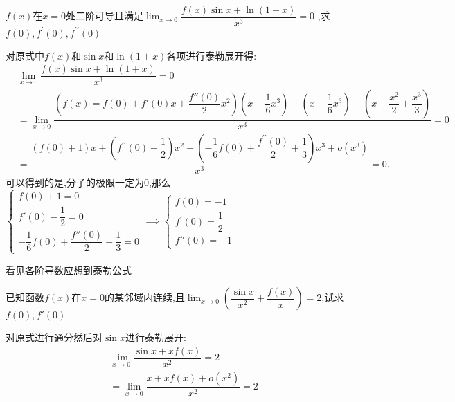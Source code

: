 \documentclass[8pt a4paper, oneside, UTF8]{ctexbook}
\begin{document}
\begin{sloppypar}
\begin{problem}
    $f(x)$在$x=0$处二阶可导且满足$\lim_{x\to 0}\dfrac{f(x)\sin x+\ln(1+x)}{x^3}=0$ ,求$f(0),f^{\prime}(0),f^{\prime\prime}(0)$
    \end{problem}
    \begin{solution}
        对原式中$f(x)$和$\sin x$和$\ln(1+x)$各项进行泰勒展开得:
        \begin{equation*}
            \begin{split}
                & \lim_{x\to 0}\dfrac{f(x)\sin x+\ln(1+x)}{x^3}=0 \\
                & = \lim_{x \to 0}\dfrac{(f(x)=f(0)+f'(0)x+\dfrac{f''(0)}{2}x^2)(x-\dfrac{1}{6}x^3)-(x-\dfrac{1}{6}x^3)+(x-\dfrac{x^2}{2}+\dfrac{x^3}{3})}{x^3}=0 \\
                & = \dfrac{(f(0)+1)x+(f^{\prime\prime}(0)-\dfrac{1}{2})x^{2}+(-\dfrac{1}{6}f(0)+\dfrac{f^{\prime\prime}(0)}{2}+\dfrac{1}{3})x^{3}+o(x^{3})}{x^{3}}=0.
            \end{split}
        \end{equation*}
        可以得到的是,分子的极限一定为0,那么$\begin{cases}f(0)+1=0\\f'(0)-\dfrac{1}{2}=0\\-\dfrac{1}{6}f(0)+\dfrac{f''(0)}{2}+\dfrac{1}{3}=0\end{cases}\implies \begin{cases}f(0)=-1\\f^{\prime}(0)=\dfrac{1}{2}\\f''(0)=-1\end{cases}$
    \end{solution}
    \begin{note}
        看见各阶导数应想到泰勒公式
    \end{note}
    \begin{problem}
    已知函数$f(x)$在$x=0$的某邻域内连续,且$\lim_{x \to 0}(\dfrac{\sin x}{x^2}+\dfrac{f(x)}{x})=2$,试求$f(0),f'(0)$
    \end{problem}
    \begin{solution}
        对原式进行通分然后对$\sin x$进行泰勒展开:
        \begin{equation*}
            \begin{split}
                & \lim_{x \to 0}\dfrac{\sin x+xf(x)}{x^2}=2\\
                & = \lim_{x \to 0}\dfrac{x+xf(x)+o(x^2)}{x^2}=2 \\
            \end{split}
        \end{equation*}

\end{solution}
\end{sloppypar}
\end{document}

